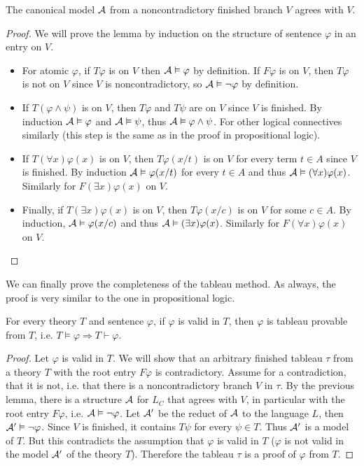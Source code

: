 \begin{lemma}
The canonical model $\mathcal{A}$ from a noncontradictory finished branch $V$ agrees with $V$.
\end{lemma}
\begin{proof}
We will prove the lemma by induction on the structure of sentence $\varphi$ in an entry on $V$.
\begin{itemize}
	\item For atomic $\varphi$, if $T \varphi$ is on $V$ then $\mathcal{A} \vDash \varphi$ by definition. If $F \varphi$ is on $V$, then $T \varphi$ is not on $V$ since $V$ is noncontradictory, so $\mathcal{A} \vDash \neg \varphi$ by definition.
  \item If $T(\varphi \land \psi)$ is on $V$, then $T \varphi$ and $T \psi$ are on $V$ since $V$ is finished. By induction $\mathcal{A} \vDash \varphi$ and $\mathcal{A} \vDash \psi$, thus $\mathcal{A} \vDash \varphi \land \psi$. For other logical connectives similarly (this step is the same as in the proof in propositional logic).
  \item If $T(\forall x) \varphi(x)$ is on $V$, then $T \varphi(x/t)$ is on $V$ for every term $t \in A$ since $V$ is finished. By induction $\mathcal{A} \vDash \varphi(x/t)$ for every $t \in A$ and thus $\mathcal{A} \vDash (\forall x) \varphi(x)$. Similarly for $F(\exists x) \varphi(x)$ on $V$.
  \item Finally, if $T(\exists x)\varphi(x)$ is on $V$, then $T \varphi(x/c)$ is on $V$ for some $c \in A$. By induction, $\mathcal{A} \vDash \varphi(x/c)$ and thus $\mathcal{A} \vDash (\exists x)\varphi(x)$. Similarly for $F(\forall x) \varphi(x)$ on $V$. 
\end{itemize}
\vspace{-\baselineskip}
\end{proof}

We can finally prove the completeness of the tableau method. As always, the proof is very similar to the one in propositional logic.

\begin{theorem}
For every theory $T$ and sentence $\varphi$, if $\varphi$ is valid in $T$, then $\varphi$ is tableau provable from $T$, i.e. $T \vDash \varphi \Rightarrow T \vdash \varphi$.
\end{theorem}
\begin{proof}
Let $\varphi$ is valid in $T$. We will show that an arbitrary finished tableau $\tau$ from a theory $T$ with the root entry $F \varphi$ is contradictory. Assume for a contradiction, that it is not, i.e. that there is a noncontradictory branch $V$ in $\tau$. By the previous lemma, there is a structure $\mathcal{A}$ for $L_C$ that agrees with $V$, in particular with the root entry $F \varphi$, i.e. $\mathcal{A} \vDash \neg \varphi$. Let $\mathcal{A}'$ be the reduct of $\mathcal{A}$ to the language $L$, then $\mathcal{A}' \vDash \neg \varphi$. Since $V$ is finished, it contains $T \psi$ for every $\psi \in T$. Thus $\mathcal{A}'$ is a model of $T$. But this contradicts the assumption that $\varphi$ is valid in $T$ ($\varphi$ is not valid in the model $\mathcal{A}'$ of the theory $T$). Therefore the tableau $\tau$ is a proof of $\varphi$ from $T$.
\end{proof}

